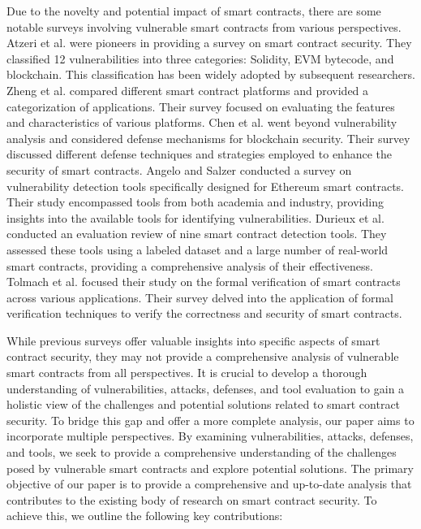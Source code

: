 \documentclass[manuscript,screen]{acmart}
\begin{document}
Due to the novelty and potential impact of smart contracts, there are some notable surveys involving vulnerable smart contracts from various perspectives. Atzeri et al. \cite{AtzeiBC16} were pioneers in providing a survey on smart contract security. They classified 12 vulnerabilities into three categories: Solidity, EVM bytecode, and blockchain. This classification has been widely adopted by subsequent researchers.
Zheng et al. \cite{zheng2020overview} compared different smart contract platforms and provided a categorization of applications. Their survey focused on evaluating the features and characteristics of various platforms.
Chen et al. \cite{ChenPNX20} went beyond vulnerability analysis and considered defense mechanisms for blockchain security. Their survey discussed different defense techniques and strategies employed to enhance the security of smart contracts.
Angelo and Salzer \cite{AngeloS19} conducted a survey on vulnerability detection tools specifically designed for Ethereum smart contracts. Their study encompassed tools from both academia and industry, providing insights into the available tools for identifying vulnerabilities. 
Durieux et al. \cite{DurieuxFAC20} conducted an evaluation review of nine smart contract detection tools. They assessed these tools using a labeled dataset and a large number of real-world smart contracts, providing a comprehensive analysis of their effectiveness.
Tolmach et al. \cite{TolmachLLLL22} focused their study on the formal verification of smart contracts across various applications. Their survey delved into the application of formal verification techniques to verify the correctness and security of smart contracts. 

While previous surveys offer valuable insights into specific aspects of smart contract security, they may not provide a comprehensive analysis of vulnerable smart contracts from all perspectives. It is crucial to develop a thorough understanding of vulnerabilities, attacks, defenses, and tool evaluation to gain a holistic view of the challenges and potential solutions related to smart contract security. To bridge this gap and offer a more complete analysis, our paper aims to incorporate multiple perspectives. By examining vulnerabilities, attacks, defenses, and tools, we seek to provide a comprehensive understanding of the challenges posed by vulnerable smart contracts and explore potential solutions. The primary objective of our paper is to provide a comprehensive and up-to-date analysis that contributes to the existing body of research on smart contract security. To achieve this, we outline the following key contributions:
\end{document}

